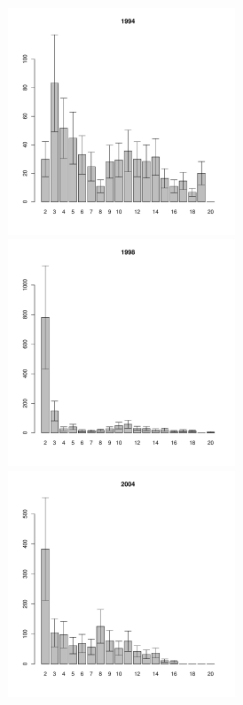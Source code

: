 \documentclass[12pt, a4paper]{article}
\begin{document}
\begin{figure}[h]
\begin{multicols}{3}
\hfill
\includegraphics[width=60mm]{../White_Sea/Luvenga_II_razrez/zostera_zone2_1994_.pdf}
\hfill
\includegraphics[width=60mm]{../White_Sea/Luvenga_II_razrez/zostera_zone2_1998_.pdf}
\hfill
\includegraphics[width=60mm]{../White_Sea/Luvenga_II_razrez/zostera_zone2_2004_.pdf}
\end{multicols}



\end{figure}
\end{document}
